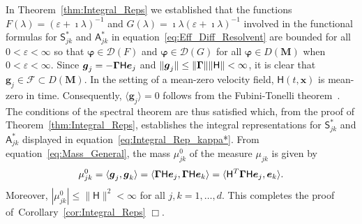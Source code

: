 \documentclass[leqno,onefignum,onetabnum]{siamltex1213}
\newcommand{\thmref}[1]{Theorem~\ref{#1}}
\newcommand{\corref}[1]{Corollary~\ref{#1}}
\newcommand{\Mb}{\mathbf{M}}
\newcommand{\Fc}{\mathcal{F}}
\newcommand{\Hm}{\mathsf{H}}
\newcommand{\Sm}{\mathsf{S}}
\newcommand{\Am}{\mathsf{A}}
\newcommand{\Ds}{\mathscr{D}}
\newcommand\bGamma{\mbox{\boldmath${\Gamma}$}}
\newcommand{\vecg}{\boldsymbol{g}}
\newcommand{\vecx}{\boldsymbol{x}}
\newcommand{\vece}{\boldsymbol{e}}
\newcommand{\vecvarphi}{\boldsymbol{\varphi}}
\begin{document}
In \thmref{thm:Integral_Reps} we established that the functions
$F(\lambda)=(\varepsilon+\imath\lambda)^{-1}$ and
$G(\lambda)=\imath\lambda(\varepsilon+\imath\lambda)^{-1}$ involved in
the functional formulas for $\Sm^*_{jk}$ and $\Am^*_{jk}$ in
equation~\eqref{eq:Eff_Diff_Resolvent} are bounded for all
$0<\varepsilon<\infty$ so that $\vecvarphi\in\Ds(F)$ and
$\vecvarphi\in\Ds(G)$ for all $\vecvarphi\in D(\Mb)$ when
$0<\varepsilon<\infty$. Since $\vecg_j=-\bGamma\Hm\vece_j$  
and $\|\vecg_j\|\leq\|\bGamma\|\|\Hm\|<\infty$, it is clear that $\vecg_j\in\Fc\subset
D(\Mb)$. In the setting of a mean-zero velocity field, $\Hm(t,\vecx)$
is mean-zero in time. Consequently, $\langle\vecg_j\rangle=0$ follows from the
Fubini-Tonelli theorem~\cite{Folland:99:RealAnalysis}. The conditions
of the spectral theorem are thus satisfied which, from the proof of
\thmref{thm:Integral_Reps}, establishes the integral representations
for $\Sm^*_{jk}$ and $\Am^*_{jk}$ displayed in
equation~\eqref{eq:Integral_Rep_kappa*}. From
equation~\eqref{eq:Mass_General}, the mass $\mu_{jk}^0$ of the measure
$\mu_{jk}$ is given by
% 
\begin{align}\label{eq:Mass}
  \mu^0_{jk}   =\langle\vecg_j,\vecg_k\rangle
        =\langle\bGamma\Hm\vece_j,\bGamma\Hm\vece_k\rangle 
        =\langle\Hm^T\bGamma\Hm\vece_j,\vece_k\rangle.     
\end{align}
%
Moreover,  $|\mu^0_{jk}|\leq\|\Hm\|^2<\infty$ for all $j,k=1,\ldots,d$.  This completes the proof
of~\corref{cor:Integral_Reps} $\Box$.  
\end{document}
